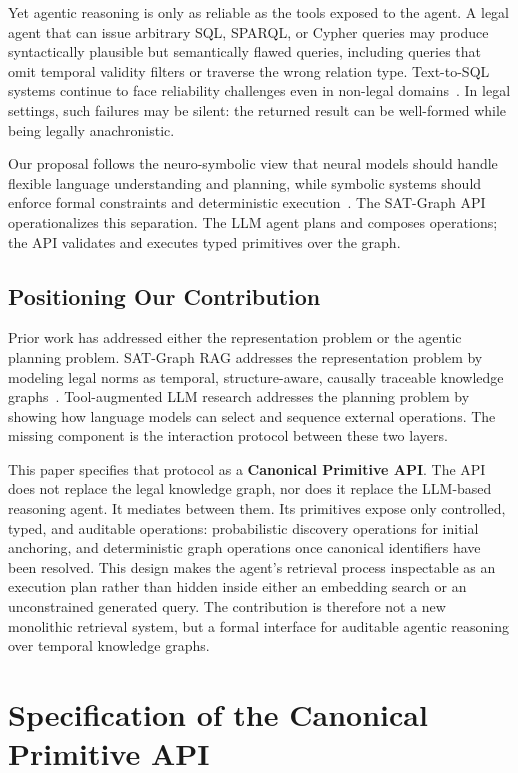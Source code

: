 \documentclass[11pt]{article}
\begin{document}
Yet agentic reasoning is only as reliable as the tools exposed to the agent. A legal agent that can issue arbitrary SQL, SPARQL, or Cypher queries may produce syntactically plausible but semantically flawed queries, including queries that omit temporal validity filters or traverse the wrong relation type. Text-to-SQL systems continue to face reliability challenges even in non-legal domains~\cite{pourreza2024dinsql,scholak2021picard}. In legal settings, such failures may be silent: the returned result can be well-formed while being legally anachronistic.

Our proposal follows the neuro-symbolic view that neural models should handle flexible language understanding and planning, while symbolic systems should enforce formal constraints and deterministic execution~\cite{garcez2015neural,besold2021neural}. The SAT-Graph API operationalizes this separation. The LLM agent plans and composes operations; the API validates and executes typed primitives over the graph.

\subsection{Positioning Our Contribution}

Prior work has addressed either the representation problem or the agentic planning problem. SAT-Graph RAG addresses the representation problem by modeling legal norms as temporal, structure-aware, causally traceable knowledge graphs~\cite{demartim2025graphrag}. Tool-augmented LLM research addresses the planning problem by showing how language models can select and sequence external operations. The missing component is the interaction protocol between these two layers.

This paper specifies that protocol as a \textbf{Canonical Primitive API}. The API does not replace the legal knowledge graph, nor does it replace the LLM-based reasoning agent. It mediates between them. Its primitives expose only controlled, typed, and auditable operations: probabilistic discovery operations for initial anchoring, and deterministic graph operations once canonical identifiers have been resolved. This design makes the agent's retrieval process inspectable as an execution plan rather than hidden inside either an embedding search or an unconstrained generated query. The contribution is therefore not a new monolithic retrieval system, but a formal interface for auditable agentic reasoning over temporal knowledge graphs.


\section{Specification of the Canonical Primitive API}
\label{sec:api_specification}
\end{document}
